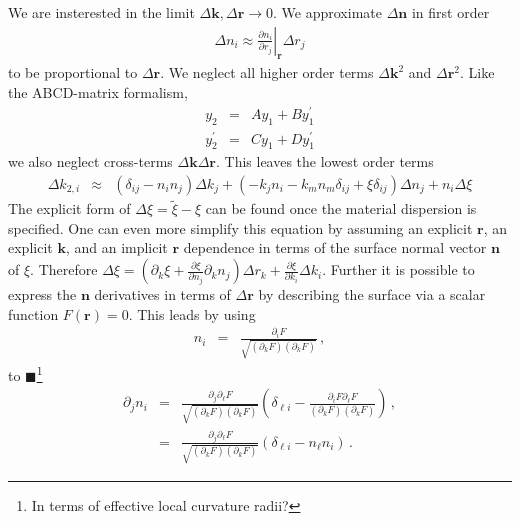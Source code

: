 \documentclass[12pt,a4paper,twoside,openright,BCOR10mm,headsepline,titlepage,abstracton,chapterprefix,final]{scrreprt}
\newcommand\Vector[1]{{\mathbf{#1}}}
\newcommand\wavenumber{k}
\newcommand\Wavevector{\Vector{\wavenumber}}
\newcommand{\remark}[1]{{\color{red}$\blacksquare$}\footnote{{\color{red}#1}}}
\begin{document}
We are insterested in the limit $\Delta\Wavevector, \Delta\Vector{r} \rightarrow 0$. We approximate $\Delta\Vector{n}$ in first order
\begin{eqnarray}
 \Delta n_i \approx \left. \frac{\partial n_i}{\partial r_j} \right|_{\Vector{r}} \Delta r_j
\end{eqnarray}
to be proportional to $\Delta\Vector{r}$. 
We neglect all higher order terms $\Delta\Wavevector^2$ and $\Delta\Vector{r}^2$.
Like the ABCD-matrix formalism, 
\begin{eqnarray}
 y_2 &=& A y_1 + B y^\prime_1 \\
 y^\prime_2 &=& C y_1 + D y^\prime_1
\end{eqnarray}
we also neglect cross-terms $\Delta\Wavevector\Delta\Vector{r}$. 
This leaves the lowest order terms
\begin{eqnarray}
 \Delta \wavenumber_{2,i} &\approx& 
   \left( \delta_{ij}  - n_i n_j \right) \Delta\wavenumber_j
   +
   \left(
     - \wavenumber_j  n_i 
     - \wavenumber_m n_m \delta_{ij}  
     + \xi \delta_{ij}
   \right) \Delta n_j
   + n_i \Delta\xi 
\end{eqnarray}
The explicit form of $\Delta\xi = \tilde{\xi} - \xi$ can be found once the material dispersion is specified.
One can even more simplify this equation by assuming an explicit $\Vector{r}$, an explicit $\Vector{k}$, and an implicit $\Vector{r}$ dependence in terms
of the surface normal vector $\Vector{n}$ of $\xi$. Therefore 
$\Delta \xi = \left(\partial_k \xi + \frac{\partial \xi}{\partial n_j} \partial_k n_j\right) \Delta r_k + \tfrac{\partial \xi}{\partial k_i} \Delta k_i$. 
Further it is possible to express the $\Vector{n}$ derivatives in terms of $\Delta \Vector{r}$ by describing the surface via
a scalar function $F(\Vector{r}) = 0$. This leads by using
\begin{eqnarray}
 n_i &=& \frac{\partial_i F}{\sqrt{(\partial_k F)(\partial_k F)}}\,,
\end{eqnarray}
to
\remark{In terms of effective local curvature radii?}
\begin{eqnarray}
  \partial_j n_i &=& \frac{\partial_j \partial_\ell F}{\sqrt{(\partial_k F)(\partial_k F)}} \left(\delta_{\ell i} - \frac{\partial_i F \partial_\ell F}{(\partial_k F)(\partial_k F)}\right)\,,\\
    &=& \frac{\partial_j \partial_\ell F}{\sqrt{(\partial_k F)(\partial_k F)}} \left(\delta_{\ell i} - n_\ell n_i\right)\,.
\end{eqnarray}
\end{document}
